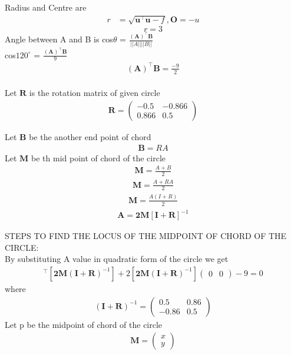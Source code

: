 \documentclass[10pt, a4paper]{article}
\newcommand{\myvec}[1]{\ensuremath{\begin{pmatrix}#1\end{pmatrix}}}
\let\vec\mathbf
\begin{document}
	Radius and Centre are
	\begin{align}
	r &=\sqrt{{\vec{u}^{\top}\vec{u}}-f },\vec{O}=-u
    \end{align}
\begin{equation}
  r=3 
\end{equation}
Angle between A and B is cos$\theta$ = $\frac{\vec{(A)}^{\top}\vec{B}}{||A|| ||B||}$ \\
\centering cos$120^{\circ}$ = $\frac{\vec{(A)}^{\top}\vec{B}}{9}$
\begin{align}
    \vec{(A)}^{\top}\vec{B}=\frac{-9}{2}
\end{align}\\
Let $\vec{R}$ is the rotation matrix of given circle  \\\vspace{1mm}
\begin{align}
 \vec{R} = \myvec{-0.5 & -0.866 \\0.866 & 0.5}
\end{align}

Let $\vec{B}$ be the another end point of chord \\\vspace{1mm}
\begin{align}
    \vec{B} = RA
\end{align}
Let $\vec{M}$ be th mid point of chord of the circle
\begin{align}
    \vec{M} = \frac{A+B}{2}
\end{align}
\begin{align}
     \vec{M} = \frac{A+RA}{2}
\end{align}
\begin{align}
     \vec{M} = \frac{A(I+R)}{2}
\end{align}
\begin{align}
     \vec{A} =\vec{2M[I+R]}^{-1}
\end{align}

STEPS TO FIND THE LOCUS OF THE MIDPOINT OF CHORD OF THE CIRCLE:\\
By substituting A value in quadratic form of the circle we get
\begin{align}
[\vec{2M(I+R)}^{-1}]^{\top}[\vec{2M(I+R)}^{-1}]+2[\vec{2M(I+R)}^{-1}]\myvec{0 & 0}-9=0
\end{align}
where
\begin{align}
	\vec{(I+R)}^{-1}=\myvec{0.5& 0.86 \\-0.86 & 0.5}
\end{align}
Let p be the midpoint of chord of the circle
\begin{align}
\vec{M}=\myvec{x\\y}
\end{align}
\end{document}
